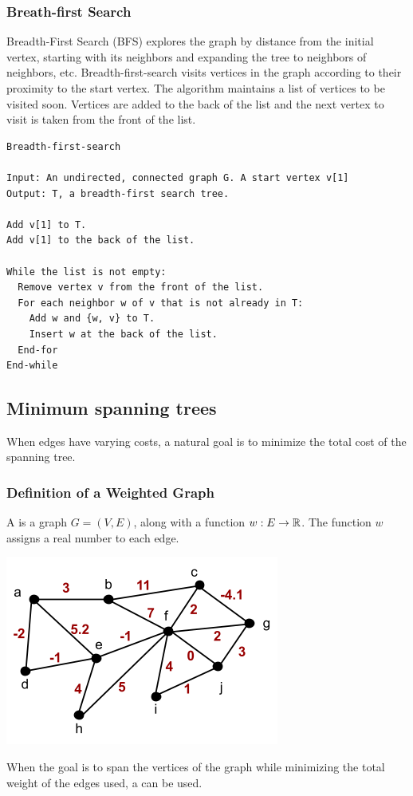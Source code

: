 \subsubsection*{Breath-first Search}
Breadth-First Search (BFS) explores the graph by distance from the initial vertex, starting with its neighbors and expanding the tree to neighbors of neighbors, etc. Breadth-first-search visits vertices in the graph according to their proximity to the start vertex. The algorithm maintains a list of vertices to be visited soon. Vertices are added to the back of the list and the next vertex to visit is taken from the front of the list.
\begin{lstlisting}
Breadth-first-search

Input: An undirected, connected graph G. A start vertex v[1]
Output: T, a breadth-first search tree.

Add v[1] to T.
Add v[1] to the back of the list.

While the list is not empty:
  Remove vertex v from the front of the list.
  For each neighbor w of v that is not already in T:
    Add w and {w, v} to T.
    Insert w at the back of the list.
  End-for
End-while
\end{lstlisting}

\subsection{Minimum spanning trees}
When edges have varying costs, a natural goal is to minimize the total cost of the spanning tree.

\subsubsection*{Definition of a Weighted Graph}
A  is a graph $G = (V,E)$, along with a function $w: E \rightarrow \mathbb{R}$. The function $w$ assigns a real number to each edge.
\begin{center}
  \includegraphics[width=0.6\linewidth]{resources/example weighted graph.png}
\end{center}
When the goal is to span the vertices of the graph while minimizing the total weight of the edges used, a  can be used.

